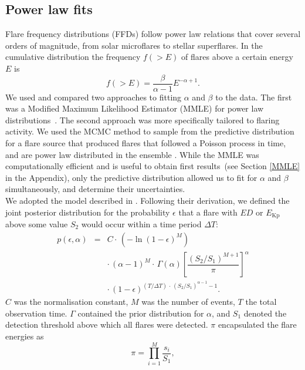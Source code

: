 \documentclass{aa}
\begin{document}
\subsection{Power law fits}
\label{powerlawfits}
Flare frequency distributions (FFDs) follow power law relations that cover several orders of magnitude, from solar microflares to stellar superflares. In the cumulative distribution the frequency $f(>E)$ of flares above a certain energy $E$ is
\begin{equation}
f(>E) = \dfrac{\beta}{\alpha - 1}E^{-\alpha + 1}.
\label{eqn:cumdist}
\end{equation}
We used and compared two approaches to fitting $\alpha$ and $\beta$ to the data. The first was a Modified Maximum Likelihood Estimator (MMLE) for power law distributions~\citep{maschberger_powerlaw_2009}. The second approach was more specifically tailored to flaring activity. We used the MCMC method to sample from the predictive distribution for a flare source that produced flares that followed a Poisson process in time, and are power law distributed in the ensemble \citep{wheatland_flaresbayes_2004}. While the MMLE was computationally efficient and is useful to obtain first results~(see Section \ref{MMLE} in the Appendix), only the predictive distribution allowed us to fit for $\alpha$ and $\beta$ simultaneously, and determine their uncertainties.
\\
We adopted the model described in \citet{wheatland_flaresbayes_2004}. Following their derivation, we defined the joint posterior distribution for the probability $\epsilon$ that a flare with $ED$ or $E_\mathrm{Kp}$ above some value $S_2$ would occur within a time period $\Delta T$:
\begin{eqnarray}
\label{joint_posterior}
p(\epsilon, \alpha) &=& C \cdot\, (-\ln(1 - \epsilon)^{M})\nonumber\\
                    && \cdot\, (\alpha-1)^M \cdot\, \Gamma(\alpha) \left[\dfrac{(S_2 / S_1)^{M+1}}{\pi} \right]^{\alpha}\nonumber\\
                    && \cdot\, (1-\epsilon)^{(T / \Delta T) \,\cdot\, (S_2 /S_1)^{\alpha-1} -1 }.
\end{eqnarray}
$C$ was the normalisation constant, $M$ was the number of events, $T$ the total observation time. $\Gamma$ contained the prior distribution for $\alpha$, and $S_1$ denoted the detection threshold above which all flares were detected. $\pi$ encapsulated the flare energies as
\begin{equation}
    \pi = \displaystyle \prod_{i=1}^M \dfrac{s_i}{S_1},
\end{equation}
\end{document}
